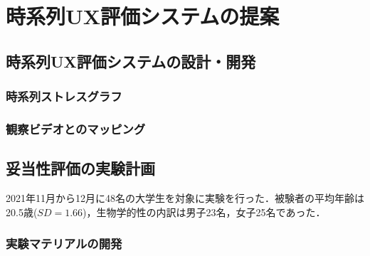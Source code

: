 \chapter{時系列UX評価システムの提案}
\label{chap:sequential}

\section{時系列UX評価システムの設計・開発}

\subsection{時系列ストレスグラフ}

\subsection{観察ビデオとのマッピング}

\section{妥当性評価の実験計画}

2021年11月から12月に48名の大学生を対象に実験を行った．被験者の平均年齢は20.5歳($SD=1.66$)，生物学的性の内訳は男子23名，女子25名であった．

\subsection{実験マテリアルの開発}

